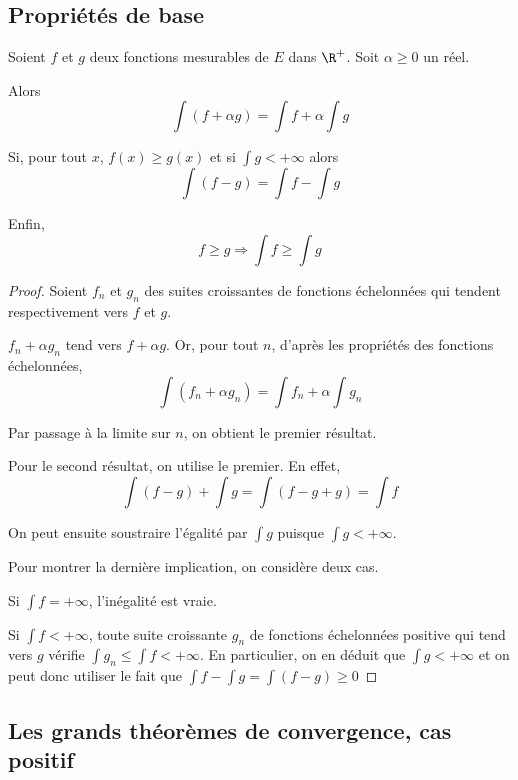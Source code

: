 \subsection{Propriétés de base}

\begin{prop}
Soient $f$ et $g$ deux fonctions mesurables de $E$ dans $\R^{+}$. Soit $\alpha \geq 0$ un réel.

Alors
\[
\displaystyle{\int} (f+ \alpha g) = \displaystyle{\int} f+\alpha \displaystyle{\int} g
\]

Si, pour tout $x$, $f(x) \geq g(x)$ et si $\displaystyle{\int} g < +\infty$ alors 
\[
\displaystyle{\int} (f-g) = \displaystyle{\int} f- \displaystyle{\int} g
\]

Enfin,
\[
f \geq g \Longrightarrow  \displaystyle{\int} f \geq \displaystyle{\int} g
\]
\end{prop}


\begin{proof}
Soient $f_n$ et $g_n$ des suites croissantes de fonctions échelonnées qui tendent respectivement vers $f$ et $g$.

$f_n+\alpha g_n$ tend vers $f+\alpha g$. Or, pour tout $n$, d'après les propriétés des fonctions échelonnées, 
\[
\displaystyle{\int} (f_n+ \alpha g_n) = \displaystyle{\int} f_n+\alpha \displaystyle{\int} g_n
\]

Par passage à la limite sur $n$, on obtient le premier résultat.

Pour le second résultat, on utilise le premier. En effet,
\[
\displaystyle{\int} (f-g) + \displaystyle{\int} g = \displaystyle{\int} (f-g+g) = \displaystyle{\int} f
\]

On peut ensuite soustraire l'égalité par $\displaystyle{\int} g$ puisque $\displaystyle{\int} g < +\infty$.

Pour montrer la dernière implication, on considère deux cas. 

Si $\displaystyle{\int} f = +\infty$, l'inégalité est vraie.

Si $\displaystyle{\int} f < +\infty$, toute suite croissante $g_n$ de fonctions échelonnées positive qui tend vers $g$ vérifie $\displaystyle{\int} g_n \leq \displaystyle{\int} f < +\infty$. En particulier, on en déduit que $\displaystyle{\int} g < +\infty$ et on peut donc utiliser le fait que $\displaystyle{\int} f - \displaystyle{\int} g = \displaystyle{\int} (f-g) \geq 0$
\end{proof}


\subsection{Les grands théorèmes de convergence, cas positif}

